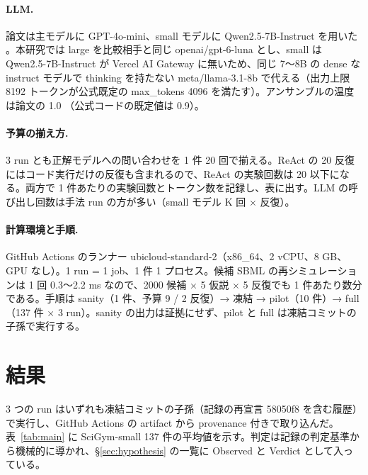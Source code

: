 \documentclass{article}
\begin{document}
\paragraph{LLM.}
論文は主モデルに GPT-4o-mini、small モデルに Qwen2.5-7B-Instruct を用いた \cite[s2.p4]{kabra-2026-llm}。本研究では large を比較相手と同じ openai/gpt-6-luna とし、small は Qwen2.5-7B-Instruct が Vercel AI Gateway に無いため、同じ 7〜8B の dense な instruct モデルで thinking を持たない meta/llama-3.1-8b で代える（出力上限 8192 トークンが公式既定の max\_tokens 4096 を満たす）。アンサンブルの温度は論文の 1.0 \cite[s2.p13]{kabra-2026-llm}（公式コードの既定値は 0.9）。

\paragraph{予算の揃え方.}
3 run とも正解モデルへの問い合わせを 1 件 20 回で揃える。ReAct の 20 反復にはコード実行だけの反復も含まれるので、ReAct の実験回数は 20 以下になる。両方で 1 件あたりの実験回数とトークン数を記録し、表に出す。LLM の呼び出し回数は手法 run の方が多い（small モデル K 回 × 反復）。

\paragraph{計算環境と手順.}
GitHub Actions のランナー ubicloud-standard-2（x86\_64、2 vCPU、8 GB、GPU なし）。1 run = 1 job、1 件 1 プロセス。候補 SBML の再シミュレーションは 1 回 0.3〜2.2 ms なので、2000 候補 × 5 仮説 × 5 反復でも 1 件あたり数分である。手順は sanity（1 件、予算 9 / 2 反復）→ 凍結 → pilot（10 件）→ full（137 件 × 3 run）。sanity の出力は証拠にせず、pilot と full は凍結コミットの子孫で実行する。


\section{結果}
\label{sec:results}
3 つの run はいずれも凍結コミットの子孫（記録の再宣言 58050f8 を含む履歴）で実行し、GitHub Actions の artifact から provenance 付きで取り込んだ。表~\ref{tab:main} に SciGym-small 137 件の平均値を示す。判定は記録の判定基準から機械的に導かれ、§\ref{sec:hypothesis} の一覧に Observed と Verdict として入っている。

{\scriptsize\setlength{\tabcolsep}{3pt}%
\let\origtabular\tabular\let\origendtabular\endtabular\newsavebox{\maintablebox}%
\renewenvironment{tabular}[1]{\begin{lrbox}{\maintablebox}\origtabular{#1}}{\origendtabular\end{lrbox}\resizebox{\textwidth}{!}{\usebox{\maintablebox}}}%
}
\end{document}
